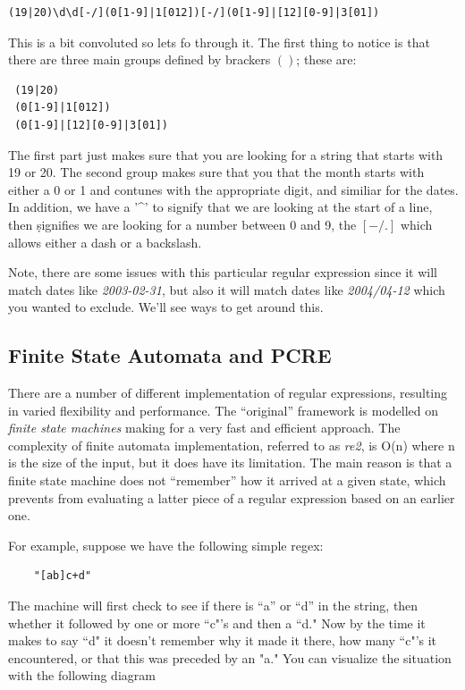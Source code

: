 \begin{verbatim}
(19|20)\d\d[-/](0[1-9]|1[012])[-/](0[1-9]|[12][0-9]|3[01])
\end{verbatim}

This is a bit convoluted so lets fo through it. The first thing to notice is that there are three main groups
defined by brackers $()$; these are:

\begin{verbatim}
 (19|20)
 (0[1-9]|1[012])
 (0[1-9]|[12][0-9]|3[01])
\end{verbatim}

The first part just makes sure that you are looking for a string that starts with 19 or 20. The second group makes sure that you that the month starts with either a 0 or 1 and contunes with the appropriate digit, and similiar for the dates. In addition, we have a '\^{}' to signify that we are looking at the start of a line, then \d signifies we are looking for a number between 0 and 9, the $[- /.]$ which allows either a dash or a backslash. 

Note, there are some issues with this particular regular expression since it will match dates like \textit{2003-02-31}, but also it will match dates like \textit{2004/04-12} which you wanted to exclude. We'll see ways to get around this. 


\subsection{Finite State Automata and PCRE}

There are a number of different implementation of regular expressions, resulting in varied flexibility and performance. The ``original'' framework is modelled on \textit{finite state machines} \cite{WPFSM} making for a very fast and efficient approach. The complexity of finite automata implementation, referred to as \textit{re2}, is O(n) where n is the size of the input, but it does have its limitation. The main reason is that a finite state machine does not ``remember'' how it arrived at a given state, which prevents from evaluating a latter piece of a regular expression based on an earlier one. 

For example, suppose we have the following simple regex:

\begin{verbatim}
    "[ab]c+d"
\end{verbatim}

The machine will first check to see if there is ``a'' or ``d'' in the string, then whether it followed by one or more ``c"'s and then a ``d." Now by the time it makes to say ``d" it doesn't remember why it made it there, how many ``c"'s it encountered, or that this was preceded by an "a." You can visualize the situation with the following diagram

